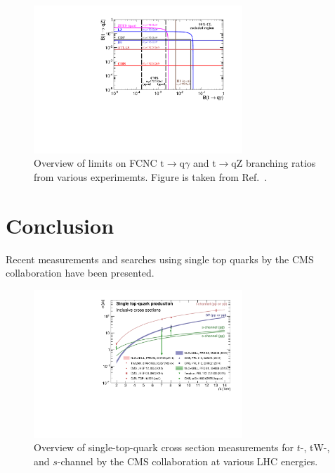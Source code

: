 \documentclass{PoS}
\begin{document}
\begin{figure}[htbp]
\begin{center}
\includegraphics[width=0.7\textwidth]{figures/limits.pdf}
\caption{\label{fig:FCNClimit}Overview of limits on FCNC $\mathrm{t}\to\mathrm{q}\gamma$ and $\mathrm{t}\to\mathrm{qZ}$ branching ratios from various experimemts. Figure is taken from Ref.~\cite{CMS-PAS-TOP-14-003}.}
\end{center}
\end{figure}



\section{Conclusion}

Recent measurements and searches using single top quarks by the CMS collaboration have been presented. 

\begin{figure}[htbp]
\begin{center}
\includegraphics[width=0.7\textwidth]{figures/singletop_sqrts.pdf}
\caption{Overview of single-top-quark cross section measurements for $t$-, tW-, and $s$-channel by the CMS collaboration at various LHC energies.}
\end{center}
\end{figure}
\end{document}
